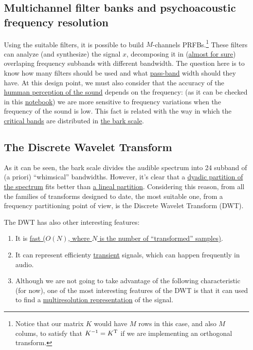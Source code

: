 \subsection{Multichannel filter banks and psychoacoustic frequency resolution}
Using the suitable filters, it is possible to build $M$-channels
PRFBs.\footnote{Notice that our matrix $K$ would have $M$ rows in this
case, and also $M$ colums, to satisfy that $K^{-1}=K^{\text T}$ if we
are implementing an orthogonal transform.}  These filters can analyze
(and synthesize) the signal $x$, decomposing it in
(\href{https://en.wikipedia.org/wiki/Low-pass_filter#Ideal_and_real_filters}{almost
  for sure}) overlaping frequency subbands with different
bandwidth. The question here is to know how many filters should be
used and what
\href{https://en.wikipedia.org/wiki/Band-pass_filter}{pass-band} width
should they have. At this design point, we must also consider that the
accuracy of the
\href{https://en.wikipedia.org/wiki/Psychoacoustics}{humman perception
  of the sound} depends on the frequency: (as it can be checked in this
\href{https://github.com/Tecnologias-multimedia/intercom/blob/master/docs/frequency_resolution.ipynb}{notebook})
we are more sensitive to frequency variations when the frequency of
the sound is low. This fact is related with the way in which the
\href{https://en.wikipedia.org/wiki/Critical_band}{critical bands} are
distributed in \href{https://en.wikipedia.org/wiki/Bark_scale}{the
  bark scale}.

\subsection{The Discrete Wavelet Transform}
As it can be seen, the bark scale divides the audible spectrum into 24
subband of (a priori) ``whimsical'' bandwidths. However, it's clear
that a \href{https://en.wikipedia.org/wiki/Octave_band}{dyadic
  partition of the spectrum} fits better than
\href{https://en.wikipedia.org/wiki/Wavelet_transform#Principle}{a
  lineal partition}. Considering this reason, from all the families of
transforms designed to date, the most suitable one, from a frequency
partitioning point of view, is the Discrete Wavelet Transform (DWT).

The DWT has also other interesting features:
\begin{enumerate}
\item It is
  \href{https://en.wikipedia.org/wiki/Discrete_wavelet_transform#Time_complexity}{fast
    ($O(N)$, where $N$ is the number of ``transformed'' samples)}.
\item It can represent efficienty
  \href{https://en.wikipedia.org/wiki/Transient_(oscillation)}{transient}
  signals, which can happen frequently in audio.
\item Although we are not going to take advantage of the following
  characteristic (for now), one of the most interesting features of
  the DWT is that it can used to find a
  \href{https://en.wikipedia.org/wiki/Multiresolution_analysis}{multiresolution
    representation} of the signal.
\end{enumerate}

